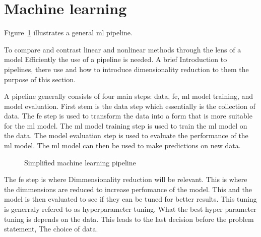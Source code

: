 \section{Machine learning}\label{sec:machine-learning}
Figure~\ref{fig:basic-machine-learning-pipeline} illustrates a general \gls{ml} pipeline.

To compare and contrast linear and nonlinear methods through the lens of a model Efficiently the use of a pipeline is needed. A brief Introduction to pipelines, there use and how to introduce dimensionality reduction to them the purpose of this section.

A pipeline generally consists of four main steps: data, \gls{fe}, \gls{ml} model training, and model evaluation. First stem is the data step which essentially is the collection of data. The \gls{fe} step is used to transform the data into a form that is more suitable for the \gls{ml} model. The \gls{ml} model training step is used to train the \gls{ml} model on the data. The model evaluation step is used to evaluate the performance of the \gls{ml} model. The \gls{ml} model can then be used to make predictions on new data. 


\begin{figure}[htb!]
    \centering
    \caption{Simplified machine learning pipeline}
    \label{fig:basic-machine-learning-pipeline}
\end{figure}

The \gls{fe} step is where Dimmensionality reduction will be relevant. This is where the dimmensions are reduced to increase perfomance of the model. This and the model is then evaluated to see if they can be tuned for better results. This tuning is generraly refered to as hyperparameter tuning. What the best hyper parameter tuning is depends on the data. This leads to the last decision before the problem statement, The choice of data.

